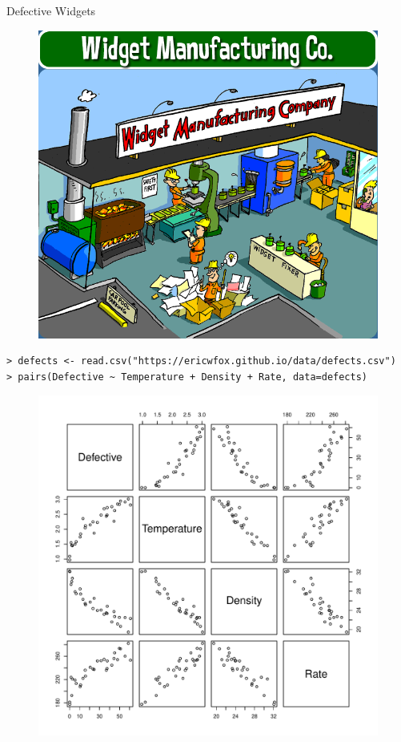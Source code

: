 \documentclass[10pt]{beamer}\usepackage[]{graphicx}\usepackage[]{color}
\begin{document}
\begin{frame}{Defective Widgets}
\begin{figure}
\includegraphics[scale=0.4]{figure/factory.png}
\end{figure}
\end{frame}

\begin{frame}[fragile]
\small
\begin{verbatim}
> defects <- read.csv("https://ericwfox.github.io/data/defects.csv")
> pairs(Defective ~ Temperature + Density + Rate, data=defects)
\end{verbatim}
\begin{figure}
\includegraphics[scale=0.4]{figure/defects_pairs1.pdf}
\end{figure}
\end{frame}
\end{document}
